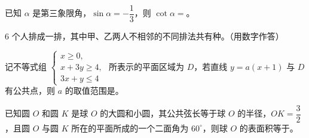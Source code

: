 \begin{question}
已知 $\alpha$ 是第三象限角，$\sin\alpha=-\dfrac13$，则 $\cot\alpha=$\gkblank{}。

\end{question}
\begin{question}
$6$ 个人排成一排，其中甲、乙两人不相邻的不同排法共有\gkblank{}种。（用数字作答）

\end{question}
\begin{question}
记不等式组 $\begin{cases}x\geqslant0,\\ x+3y\geqslant4,\\ 3x+y\leqslant4\end{cases}$ 所表示的平面区域为 $D$，若直线 $y=a(x+1)$ 与 $D$ 有公共点，则 $a$ 的取值范围是\gkblank{}。

\end{question}
\begin{question}
已知圆 $O$ 和圆 $K$ 是球 $O$ 的大圆和小圆，其公共弦长等于球 $O$ 的半径，$OK=\dfrac32$，且圆 $O$ 与圆 $K$ 所在的平面所成的一个二面角为 $60^\circ$，则球 $O$ 的表面积等于\gkblank{}。

\end{question}

